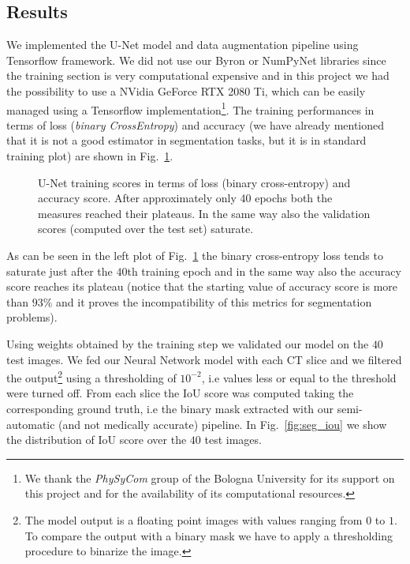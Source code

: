 \documentclass{standalone}
\begin{document}
\subsection[Results]{Results}\label{segmentation:results}

We implemented the U-Net model and data augmentation pipeline using \textsf{Tensorflow} framework.
We did not use our \textsf{Byron} or \textsf{NumPyNet} libraries since the training section is very computational expensive and in this project we had the possibility to use a NVidia GeForce RTX 2080 Ti, which can be easily managed using a \textsf{Tensorflow} implementation\footnote{
  We thank the \emph{PhySyCom} group of the Bologna University for its support on this project and for the availability of its computational resources.
}.
The training performances in terms of loss (\emph{binary CrossEntropy}) and accuracy (we have already mentioned that it is not a good estimator in segmentation tasks, but it is  in standard training plot) are shown in Fig.~\ref{fig:seg_train}.

\begin{figure}[htbp]
\centering
\def\svgwidth{0.85\textwidth}

\caption{U-Net training scores in terms of loss (binary cross-entropy) and accuracy score.
After approximately only 40 epochs both the measures reached their plateaus.
In the same way also the validation scores (computed over the test set) saturate.
}
\label{fig:seg_train}
\end{figure}

As can be seen in the left plot of Fig.~\ref{fig:seg_train} the binary cross-entropy loss tends to saturate just after the $40$th training epoch and in the same way also the accuracy score reaches its plateau (notice that the starting value of accuracy score is more than $93$\% and it proves the incompatibility of this metrics for segmentation problems).

Using weights obtained by the training step we validated our model on the $40$ test images.
We fed our Neural Network model with each CT slice and we filtered the output\footnote{
  The model output is a floating point images with values ranging from $0$ to $1$.
  To compare the output with a binary mask we have to apply a thresholding procedure to binarize the image.
} using a thresholding of $10^{-2}$, i.e values less or equal to the threshold were turned off.
From each slice the IoU score was computed taking the corresponding ground truth, i.e the binary mask extracted with our semi-automatic (and not medically accurate) pipeline.
In Fig.~\ref{fig:seg_iou} we show the distribution of IoU score over the $40$ test images.
\end{document}
